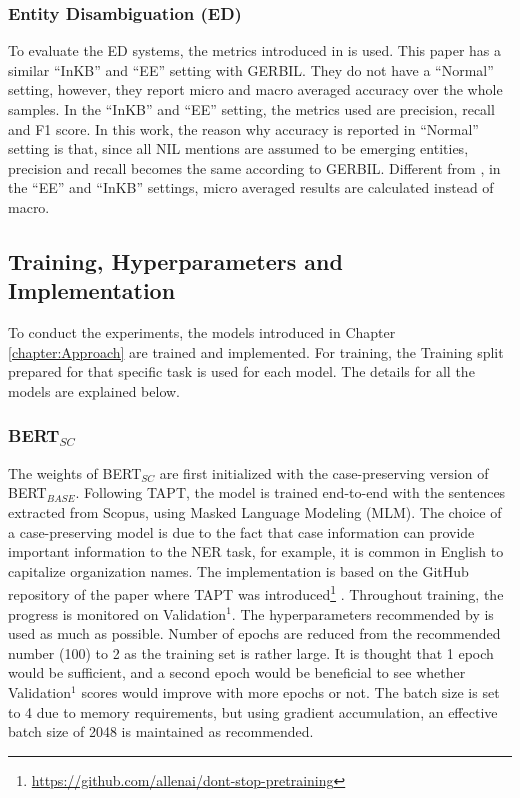 \documentclass{report}
\theoremstyle{definition}
\theoremstyle{remark}
\begin{document}
\subsubsection{Entity Disambiguation (ED)}
To evaluate the ED systems, the metrics introduced in \cite{NILMentions} is used. This paper has a similar ``InKB'' and ``EE'' setting with GERBIL. They do not have a ``Normal'' setting, however, they report micro and macro averaged accuracy over the whole samples. In the ``InKB'' and ``EE'' setting, the metrics used are precision, recall and F1 score. In this work, the reason why accuracy is reported in ``Normal'' setting is that, since all NIL mentions are assumed to be emerging entities, precision and recall becomes the same according to GERBIL. Different from \cite{NILMentions}, in the ``EE'' and ``InKB'' settings, micro averaged results are calculated instead of macro. 


\subsection{Training, Hyperparameters and Implementation}
\label{sec:EvalExpSetupTraining}
To conduct the experiments, the models introduced in Chapter \ref{chapter:Approach} are trained and implemented. For training, the Training split prepared for that specific task is used for each model. The details for all the models are explained below.
\subsubsection{BERT$_{SC}$}
The weights of BERT$_{SC}$ are first initialized with the case-preserving version of BERT$_{BASE}$. Following TAPT, the model is trained end-to-end with the sentences extracted from Scopus, using Masked Language Modeling (MLM). The choice of a case-preserving model is due to the fact that case information can provide important information to the NER task, for example, it is common in English to capitalize organization names. The implementation is based on the GitHub repository of the paper where TAPT was introduced\footnote{\url{https://github.com/allenai/dont-stop-pretraining}} \cite{DontStop}. Throughout training, the progress is monitored on Validation$^1$. The hyperparameters recommended by \cite{DontStop} is used as much as possible. Number of epochs are reduced from the recommended number (100) to 2 as the training set is rather large. It is thought that 1 epoch would be sufficient, and a second epoch would be beneficial to see whether Validation$^1$ scores would improve with more epochs or not. The batch size is set to 4 due to memory requirements, but using gradient accumulation, an effective batch size of 2048 is maintained as recommended. 
\end{document}
